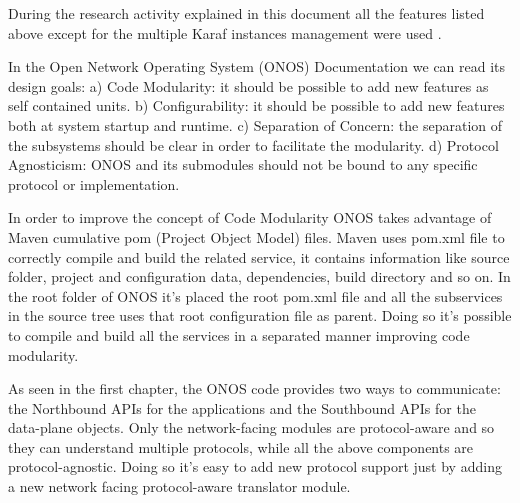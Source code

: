 \documentclass[a4paper,10pt]{memoir}
\begin{document}
During the research activity explained in this document all the features listed above except for the multiple Karaf instances management were used \cite{karaf-docs}.
\medskip

In the Open Network Operating System (ONOS) Documentation we can read its design goals: a) Code Modularity: it should be possible to add new features as self contained units. b) Configurability: it should be possible to add new features both at system startup and runtime. c) Separation of Concern: the separation of the subsystems should be clear in order to facilitate the modularity. d) Protocol Agnosticism: ONOS and its submodules should not be bound to any specific protocol or implementation.

In order to improve the concept of Code Modularity ONOS takes advantage of Maven cumulative pom (Project Object Model) files. Maven uses pom.xml file to correctly compile and build the related service, it contains information like source folder, project and configuration data, dependencies, build directory and so on. In the root folder of ONOS it's placed the root pom.xml file and all the subservices in the source tree uses that root configuration file as parent. Doing so it's possible to compile and build all the services in a separated manner improving code modularity. 

As seen in the first chapter, the ONOS code provides two ways to communicate: the Northbound APIs for the applications and the Southbound APIs for the data-plane objects. Only the network-facing modules are protocol-aware and so they can understand multiple protocols, while all the above components are protocol-agnostic. Doing so it's easy to add new protocol support just by adding a new network facing protocol-aware translator module.
\end{document}
